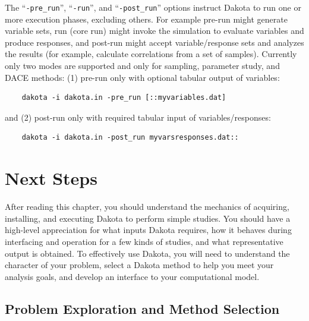 The ``\texttt{-pre\_run}'', ``\texttt{-run}'', and
``\texttt{-post\_run}'' options instruct Dakota to run one or more
execution phases, excluding others. For example pre-run might
generate variable sets, run (core run) might invoke the simulation to
evaluate variables and produce responses, and post-run might accept
variable/response sets and analyzes the results (for example,
calculate correlations from a set of samples). Currently only two
modes are supported and only for sampling, parameter study, and DACE
methods: (1) pre-run only with optional tabular output of variables:
\begin{small}
\begin{verbatim}
    dakota -i dakota.in -pre_run [::myvariables.dat]
\end{verbatim}
\end{small}
and (2) post-run only with required tabular input of variables/responses:
\begin{small}
\begin{verbatim}
    dakota -i dakota.in -post_run myvarsresponses.dat::
\end{verbatim}
\end{small}


\section{Next Steps}\label{tutorial:nextsteps}

After reading this chapter, you should understand the mechanics of
acquiring, installing, and executing Dakota to perform simple studies.
You should have a high-level appreciation for what inputs Dakota
requires, how it behaves during interfacing and operation for a few
kinds of studies, and what representative output is obtained.  To
effectively use Dakota, you will need to understand the character of
your problem, select a Dakota method to help you meet your analysis
goals, and develop an interface to your computational model.

\subsection{Problem Exploration and Method Selection}\label{tutorial:exploration}


